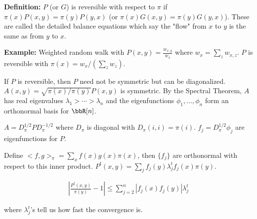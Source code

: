 \documentclass[../../../Master/AppliedStochastics.tex]{subfiles}
\begin{document}
\vspace{5mm}
\textbf{Definition:} $P$ (or $G$) is reversible with respect to $\pi$ if 
$\pi(x)P(x,y)=\pi(y)P(y,x)$ (or $\pi(x)G(x,y)=\pi(y)G(y,x)$). These are called 
the detailed balance equations which say the "flow" from $x$ to $y$ is the same 
as from $y$ to $x$. 

\vspace{5mm}
\textbf{Example:} Weighted random walk with $P(x,y)=\frac{w_{x,y}}{w_x}$ where 
$w_x=\sum_zw_{x,z}$. $P$ is reversible with $\pi(x)=w_x/\left(\sum_zw_z\right)$.

\vspace{5mm}
If $P$ is reversible, then $P$ need not be symmetric but can be diagonalized. 
$A(x,y)=\sqrt{\pi(x)/\pi(y)}P(x,y)$ is symmetric. By the Spectral Theorem, $A$ 
has real eigenvalues $\lambda_1>\cdots>\lambda_n$ and the eigenfunctions 
$\phi_1,\ldots,\phi_n$ form an orthonormal basis for $\bbR[n]$.

\vspace{5mm}
$A=D_\pi^{1/2}PD_\pi^{-1/2}$ where $D_\pi$ is diagonal with 
$D_\pi(i,i)=\pi(i)$. $f_j=D_\pi^{1/2}\phi_j$ are eigenfunctions for $P$.

\vspace{5mm}
Define $<f,g>_\pi=\sum_xf(x)g(x)\pi(x)$, then $\{f_j\}$ are orthonormal with 
respect to this inner product. $P^t(x,y)=\sum_jf_j(y)\lambda_j^tf_j(x)\pi(y)$.

$$\begin{aligned}
\left|\frac{P^t(x,y)}{\pi(y)}-1\right|\leq \sum_{j=2}^n|f_j(x)f_j(y)|\lambda_j^t
\end{aligned}$$

where $\lambda_j^t$'s tell us how fast the convergence is. 


%
\end{document}
